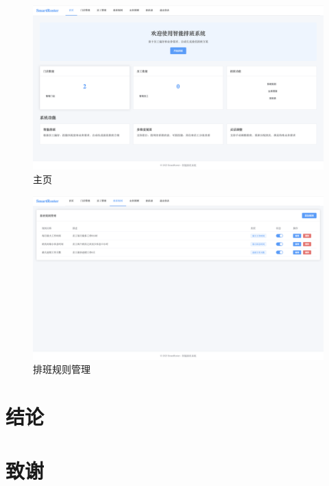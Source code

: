\documentclass{ctexart}
\begin{document}
\begin{figure}[H]
    \centering
    \includegraphics[width=0.8\linewidth]{./source/主页.png}
    \caption{主页}
    \label{fig:microservice-arch}
\end{figure}
\begin{figure}[H]
    \centering
    \includegraphics[width=0.8\linewidth]{./source/排班规则管理.png}
    \caption{排班规则管理}
    \label{fig:microservice-arch}
\end{figure}


\section{结论}


\section*{致谢}



\end{document}
